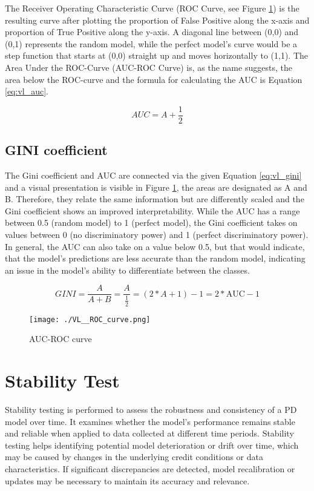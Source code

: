 The Receiver Operating Characteristic Curve (ROC Curve, see Figure \ref{fig:vl_roccurve}) is the resulting curve after plotting the proportion of False Positive along the x-axis and proportion of True Positive along the y-axis. A diagonal line between (0,0) and (0,1) represents the random model, while the perfect model's curve would be a step function that starts at (0,0) straight up and moves horizontally to (1,1). The Area Under the ROC-Curve (AUC-ROC Curve) is, as the name suggests, the area below the ROC-curve and the formula for calculating the AUC is Equation \ref{eq:vl_auc}. \cite{AUC:2023}

\begin{equation}
AUC = A + \frac{1}{2} \label{eq:vl_auc}
\end{equation}

\subsection{GINI coefficient}
\label{sec:gini}
The Gini coefficient and AUC are connected via the given Equation \ref{eq:vl_gini} and a visual presentation is visible in Figure \ref{fig:vl_roccurve}, the areas are designated as A and B. Therefore, they relate the same information but are differently scaled and the Gini coefficient shows an improved interpretability. While the AUC has a range between 0.5 (random model) to 1 (perfect model), the Gini coefficient takes on values between 0 (no discriminatory power) and 1 (perfect discriminatory power). In general, the AUC can also take on a value below 0.5, but that would indicate, that the model's predictions are less accurate than the random model, indicating an issue in the model's ability to differentiate between the classes. \cite{AUC:2023}

\begin{equation}
GINI = \frac{A}{A + B} = \frac{A}{\frac{1}{2}} = (2 * A + 1) - 1 = 2 * \text{AUC} - 1 \label{eq:vl_gini}
\end{equation}

\begin{figure}[H]
	\centering
	\texttt{[image: ./VL\_\_ROC\_curve.png]}
    \caption{AUC-ROC curve}
    \label{fig:vl_roccurve}
\end{figure}

\section{Stability Test}
Stability testing is performed to assess the robustness and consistency of a PD model over time. It examines whether the model's performance remains stable and reliable when applied to data collected at different time periods. Stability testing helps identifying potential model deterioration or drift over time, which may be caused by changes in the underlying credit conditions or data characteristics. If significant discrepancies are detected, model recalibration or updates may be necessary to maintain its accuracy and relevance.
